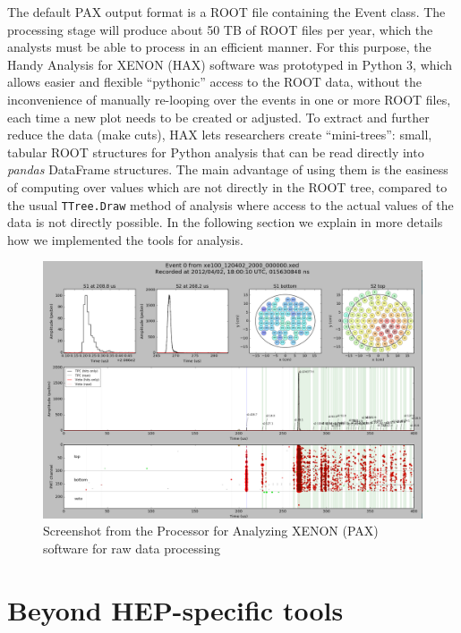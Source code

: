 \documentclass[a4paper]{jpconf}
\begin{document}
The default PAX output format is a ROOT file containing the Event class. 
The processing stage will produce about 50 TB of ROOT files per year, which the analysts must be able to process in an efficient manner. 
For this purpose, the Handy Analysis for XENON (HAX) software was prototyped in Python 3, which 
allows easier and flexible ``pythonic'' access to the ROOT data, without the inconvenience of manually re-looping over the events in one or more ROOT files, each time 
a new plot needs to be created or adjusted. To extract and further reduce the data (make cuts), HAX lets researchers create ``mini-trees'': small, tabular ROOT structures for 
Python analysis that can be read directly into \textit{pandas} DataFrame structures. The main advantage of using them is the easiness of computing over values which 
are not directly in the ROOT tree, compared to the usual \texttt{TTree.Draw} method of analysis where access to the actual values of the data is not directly possible.
In the following section we explain in more details how we implemented the tools for analysis.

\begin{figure}[!t]
 \centering
\begin{center}
\includegraphics[width=0.9\linewidth]{./graphics/paxer.png}
\end{center}
\caption{Screenshot from the Processor for Analyzing XENON (PAX) software for raw data processing}
\label{fig:paxer}
\end{figure}

\section{Beyond HEP-specific tools}
\end{document}
